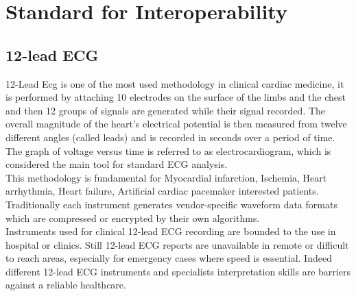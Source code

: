 \section{Standard for Interoperability}
\subsection{12-lead ECG}
\label{subsection:12leadecg}
12-Lead Ecg is one of the most used methodology in clinical cardiac medicine, it is performed by attaching 10 electrodes on the surface of the limbs and the chest and then 12 groups of signals are generated while their signal recorded. The overall magnitude of the heart's electrical potential is then measured from twelve different angles (called leads) and is recorded in seconds over a period of time.\\
The graph of voltage versus time is referred to as electrocardiogram, which is considered the main tool for standard ECG analysis. \cite{electrocardiography_it} \cite{electrocardiography_en}\\
This methodology is fundamental for Myocardial infarction, Ischemia, Heart arrhythmia, Heart failure, Artificial cardiac pacemaker interested patients. Traditionally each instrument generates vendor-specific waveform data formats which are compressed or encrypted by their own algorithms.\\
Instruments used for clinical 12-lead ECG recording are bounded to the use in hospital or clinics. Still 12-lead ECG reports are unavailable in remote or difficult to reach areas, especially for emergency cases where speed is essential. Indeed different 12-lead ECG instruments and specialists interpretation skills are barriers against a reliable healthcare.
\cite{Hsieh2012}

